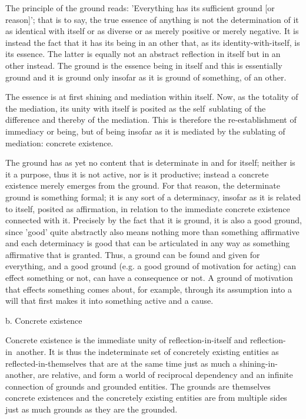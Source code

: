 The principle of the ground reads:
'Everything has its sufficient ground [or reason]';
that is to say, the true essence of anything is not
the determination of it as identical with itself or
as diverse or as merely positive or merely negative.
It is instead the fact that it has its being in an other that,
as its identity-with-itself, is its essence.
The latter is equally not an abstract reflection
in itself but in an other instead.
The ground is the essence being in itself and
this is essentially ground and it is ground only
insofar as it is ground of something, of an other.

The essence is at first shining and mediation within itself.
Now, as the totality of the mediation, its unity with itself is posited
as the self~sublating of the difference and thereby of the mediation.
This is therefore the re-establishment of immediacy or being,
but of being insofar as it is mediated by the sublating of mediation:
concrete existence.

The ground has as yet no content that is determinate in and for itself;
neither is it a purpose, thus it is not active, nor is it productive;
instead a concrete existence merely emerges from the ground.
For that reason, the determinate ground is something formal;
it is any sort of a determinacy,
insofar as it is related to itself, posited as affirmation,
in relation to the immediate concrete existence connected with it.
Precisely by the fact that it is ground, it is also a good ground,
since 'good' quite abstractly also means nothing more than something
affirmative and each determinacy is good that can be articulated in
any way as something affirmative that is granted.
Thus, a ground can be found and given for everything,
and a good ground (e.g. a good ground of motivation for acting)
can effect something or not, can have a consequence or not.
A ground of motivation that effects something comes about,
for example, through its assumption into a will that
first makes it into something active and a cause.

b. Concrete existence

Concrete existence is the immediate unity of
reflection-in-itself and reflection-in~another.
It is thus the indeterminate set of concretely
existing entities as reflected-in-themselves
that are at the same time just as much
a shining-in-another, are relative, and
form a world of reciprocal dependency and
an infinite connection of grounds and grounded entities.
The grounds are themselves concrete existences and
the concretely existing entities are from multiple sides
just as much grounds as they are the grounded.

